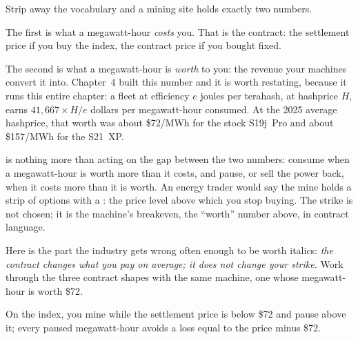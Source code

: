 Strip away the vocabulary and a mining site holds exactly two numbers.

The first is what a megawatt-hour \emph{costs} you. That is the contract: the settlement price if you buy the index, the contract price if you bought fixed.

The second is what a megawatt-hour is \emph{worth} to you: the revenue your machines convert it into. Chapter~4 built this number and it is worth restating, because it runs this entire chapter: a fleet at efficiency $e$ joules per terahash, at hashprice $H$, earns $41{,}667 \times H / e$ dollars per megawatt-hour consumed. %
At the 2025 average hashprice, that worth was about \$72/MWh for the stock S19j~Pro and about \$157/MWh for the S21~XP. %

 is nothing more than acting on the gap between the two numbers: consume when a megawatt-hour is worth more than it costs, and pause, or sell the power back, when it costs more than it is worth. An energy trader would say the mine holds a strip of options with a : the price level above which you stop buying. The strike is not chosen; it is the machine's breakeven, the ``worth'' number above, in contract language.

Here is the part the industry gets wrong often enough to be worth italics: \emph{the contract changes what you pay on average; it does not change your strike.} Work through the three contract shapes with the same machine, one whose megawatt-hour is worth \$72.

On the index, you mine while the settlement price is below \$72 and pause above it; every paused megawatt-hour avoids a loss equal to the price minus \$72.

